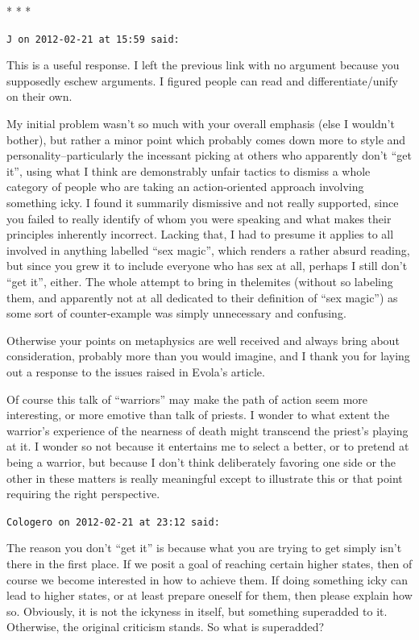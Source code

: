 \begin{center}* * *\end{center}

\begin{footnotesize}
\begin{sffamily}
\texttt{J on 2012-02-21 at 15:59 said:}

This is a useful response. I left the previous link with no argument because you supposedly eschew arguments. I figured people can read and differentiate/unify on their own.

My initial problem wasn't so much with your overall emphasis (else I wouldn't bother), but rather a minor point which probably comes down more to style and personality--particularly the incessant picking at others who apparently don't ``get it'', using what I think are demonstrably unfair tactics to dismiss a whole category of people who are taking an action-oriented approach involving something icky. I found it summarily dismissive and not really supported, since you failed to really identify of whom you were speaking and what makes their principles inherently incorrect. Lacking that, I had to presume it applies to all involved in anything labelled ``sex magic'', which renders a rather absurd reading, but since you grew it to include everyone who has sex at all, perhaps I still don't ``get it'', either. The whole attempt to bring in thelemites (without so labeling them, and apparently not at all dedicated to their definition of ``sex magic'') as some sort of counter-example was simply unnecessary and confusing.

Otherwise your points on metaphysics are well received and always bring about consideration, probably more than you would imagine, and I thank you for laying out a response to the issues raised in Evola's article.

Of course this talk of ``warriors'' may make the path of action seem more interesting, or more emotive than talk of priests. I wonder to what extent the warrior's experience of the nearness of death might transcend the priest's playing at it. I wonder so not because it entertains me to select a better, or to pretend at being a warrior, but because I don't think deliberately favoring one side or the other in these matters is really meaningful except to illustrate this or that point requiring the right perspective.

\hfill

\texttt{Cologero on 2012-02-21 at 23:12 said:}

The reason you don't ``get it'' is because what you are trying to get simply isn't there in the first place. If we posit a goal of reaching certain higher states, then of course we become interested in how to achieve them. If doing something icky can lead to higher states, or at least prepare oneself for them, then please explain how so. Obviously, it is not the ickyness in itself, but something superadded to it. Otherwise, the original criticism stands. So what is superadded?


\end{sffamily}
\end{footnotesize}
